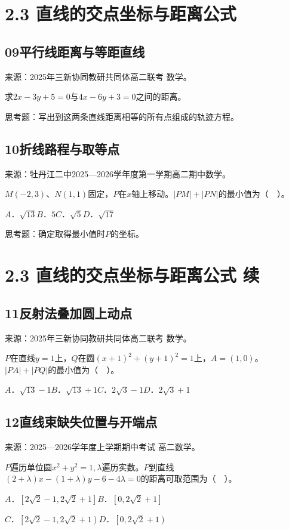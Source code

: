 \documentclass[UTF8,11pt,a4paper,fontset=windows]{ctexart}
\newcommand{\qhead}[2]{\subsection{#1\texorpdfstring{\quad}{ }#2}}
\newcommand{\qsource}[1]{{\footnotesize 来源：#1。\par}}
\begin{document}
\clearpage

\section{2.3 直线的交点坐标与距离公式}

\qhead{09}{平行线距离与等距直线}
\qsource{2025年三新协同教研共同体高二联考 数学}
求\(2x- 3y+ 5= 0\)与\(4x- 6y+ 3= 0\)之间的距离。\par
思考题：写出到这两条直线距离相等的所有点组成的轨迹方程。\par
\vspace{12mm}\vfill

\qhead{10}{折线路程与取等点}
\qsource{牡丹江二中2025—2026学年度第一学期高二期中数学}
\(M\left(- 2,\allowbreak 3\right)\)、\(N\left(1,\allowbreak 1\right)\)固定，\(P\)在\(x\)轴上移动。\(\lvert PM\rvert + \lvert PN\rvert \)的最小值为（　）。\par
\(A\)．\(\sqrt{13}\)\qquad \(B\)．\(5\)\qquad \(C\)．\(\sqrt{5}\)\qquad \(D\)．\(\sqrt{17}\)\par
思考题：确定取得最小值时\(P\)的坐标。\par
\vspace{12mm}\vfill

\mbox{}

\clearpage

\section{2.3 直线的交点坐标与距离公式 续}

\qhead{11}{反射法叠加圆上动点}
\qsource{2025年三新协同教研共同体高二联考 数学}
\(P\)在直线\(y= 1\)上，\(Q\)在圆\(\left(x+ 1\right)^{2}+ \left(y+ 1\right)^{2}= 1\)上，\(A= \left(1,\allowbreak 0\right)\)。\(\lvert PA\rvert + \lvert PQ\rvert \)的最小值为（　）。\par
\(A\)．\(\sqrt{13}- 1\)\qquad \(B\)．\(\sqrt{13}+ 1\)\qquad \(C\)．\(2\sqrt{3}- 1\)\qquad \(D\)．\(2\sqrt{3}+ 1\)\par
\vspace{12mm}\vfill

\qhead{12}{直线束缺失位置与开端点}
\qsource{2025—2026学年度上学期期中考试 高二数学}
\(P\)遍历单位圆\(x^{2}+ y^{2}= 1,\allowbreak \lambda \)遍历实数。\(P\)到直线\(\left(2+ \lambda \right)x- \left(1+ \lambda \right)y- 6- 4\lambda = 0\)的距离可取范围为（　）。\par
\(A\)．\(\left[2\sqrt{2}- 1,\allowbreak 2\sqrt{2}+ 1\right]\)\qquad \(B\)．\(\left[0,\allowbreak 2\sqrt{2}+ 1\right]\)\par
\(C\)．\(\left[2\sqrt{2}- 1,\allowbreak 2\sqrt{2}+ 1\right)\)\qquad \(D\)．\(\left[0,\allowbreak 2\sqrt{2}+ 1\right)\)\par
\vspace{12mm}\vfill
\end{document}
